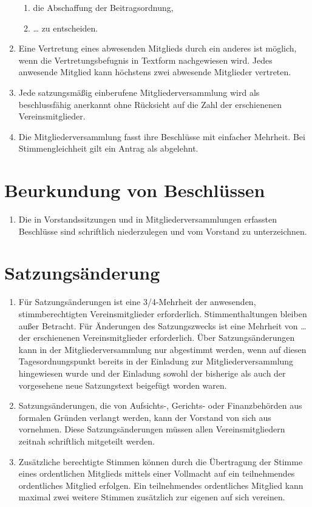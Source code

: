 \documentclass[a4paper,ngerman]{scrartcl}
\begin{document}
\begin{enumerate}
\begin{enumerate}
\item die Abschaffung der Beitragsordnung,
\item {}\dots{} zu entscheiden.
\end{enumerate}
\item Eine Vertretung eines abwesenden Mitglieds durch ein anderes ist möglich, wenn die Vertretungsbefugnis in Textform nachgewiesen wird. Jedes anwesende Mitglied kann höchstens zwei abwesende Mitglieder vertreten.
\item Jede satzungsmäßig einberufene Mitgliederversammlung wird als beschlussfähig anerkannt ohne Rücksicht auf die Zahl der erschienenen Vereinsmitglieder.
\item Die Mitgliederversammlung fasst ihre Beschlüsse mit einfacher Mehrheit. Bei Stimmengleichheit gilt ein Antrag als abgelehnt.
\end{enumerate}

\section{Beurkundung von Beschlüssen}
\begin{enumerate}
\item Die in Vorstandssitzungen und in Mitgliederversammlungen erfassten Beschlüsse sind schriftlich niederzulegen und vom Vorstand zu unterzeichnen.
\end{enumerate}

\section{Satzungsänderung}
\begin{enumerate}
\item Für Satzungsänderungen ist eine 3/4-Mehrheit der anwesenden, stimmberechtigten Vereinsmitglieder erforderlich. Stimmenthaltungen bleiben außer Betracht.
 Für Änderungen des Satzungszwecks ist eine Mehrheit von \dots{} der erschienenen Vereinsmitglieder erforderlich. Über Satzungsänderungen kann in der Mitgliederversammlung nur abgestimmt werden, wenn auf diesen Tagesordnungspunkt bereits in der Einladung zur Mitgliederversammlung hingewiesen wurde und der Einladung sowohl der bisherige als auch der vorgesehene neue Satzungstext beigefügt worden waren.
\item Satzungsänderungen, die von Aufsichts-, Gerichts- oder Finanzbehörden aus formalen Gründen verlangt werden, kann der Vorstand von sich aus vornehmen. Diese Satzungsänderungen müssen allen Vereinsmitgliedern zeitnah schriftlich mitgeteilt werden.
\item Zusätzliche berechtigte Stimmen können durch die Übertragung der Stimme eines ordentlichen Mitglieds mittels einer Vollmacht auf ein teilnehmendes ordentliches Mitglied erfolgen. Ein teilnehmendes ordentliches Mitglied kann maximal zwei weitere Stimmen zusätzlich zur eigenen auf sich vereinen.
\end{enumerate}
\end{document}
